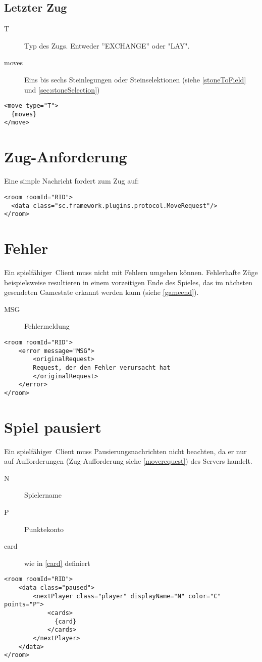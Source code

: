 \documentclass[12pt,a4paper, ngerman, oneside]{scrartcl}
\begin{document}
\subsection{\label{lastmove}Letzter Zug}
\begin{description}
\item[T] Typ des Zugs. Entweder ''EXCHANGE'' oder "LAY".
\item[moves] Eins bis sechs Steinlegungen oder Steinselektionen (siehe \ref{stoneToField} und \ref{sec:stoneSelection})
\end{description}
\begin{verbatim}
<move type="T">
  {moves}
</move>
\end{verbatim}

\section{\label{moverequest}Zug-Anforderung}
Eine simple Nachricht fordert zum Zug auf:
\begin{verbatim}
<room roomId="RID">
  <data class="sc.framework.plugins.protocol.MoveRequest"/>
</room>
\end{verbatim}

\section{Fehler}
Ein \glqq spielfähiger\grqq\ Client muss nicht mit Fehlern umgehen können.
Fehlerhafte Züge beispielsweise resultieren in einem vorzeitigen Ende des
Spieles, das im nächsten gesendeten Gamestate erkannt werden kann (siehe \ref{gameend}).
\begin{description}
\item[MSG] Fehlermeldung
\end{description}
\begin{verbatim}
<room roomId="RID">
	<error message="MSG">
		<originalRequest>
		Request, der den Fehler verursacht hat
		</originalRequest>
	</error>
</room>
\end{verbatim}

\section{Spiel pausiert}
Ein \glqq spielfähiger\grqq\ Client muss Pausierungsnachrichten nicht beachten,
da er nur auf Aufforderungen (Zug-Aufforderung siehe \ref{moverequest}) des Servers handelt.
\begin{description}
\item[N] Spielername
\item[P] Punktekonto
\item[card] wie in \ref{card} definiert
\end{description}
\begin{verbatim}
<room roomId="RID">
	<data class="paused">
		<nextPlayer class="player" displayName="N" color="C" points="P">
			<cards>
			  {card}
			</cards>
		</nextPlayer>
	</data>
</room>
\end{verbatim}
\end{document}
